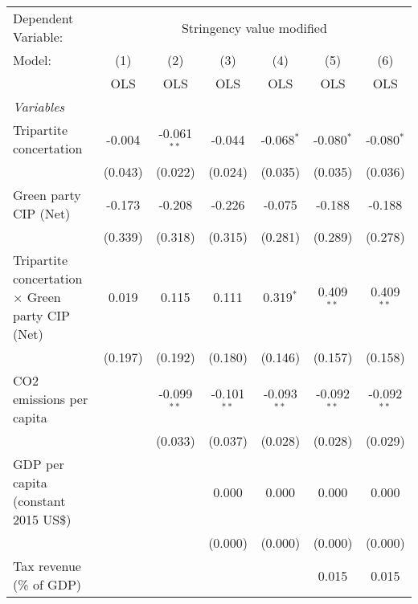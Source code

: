 
\begingroup
\centering
\begin{tabular}{lcccccc}
   \toprule
   Dependent Variable: & \multicolumn{6}{c}{Stringency value modified}\\
   Model:                                                  & (1)     & (2)           & (3)           & (4)           & (5)           & (6)\\  
                                                           &  OLS    & OLS           & OLS           & OLS           & OLS           & OLS\\  
   \midrule
   \emph{Variables}\\
   Tripartite concertation                                 & -0.004  & -0.061$^{**}$ & -0.044        & -0.068$^{*}$  & -0.080$^{*}$  & -0.080$^{*}$\\   
                                                           & (0.043) & (0.022)       & (0.024)       & (0.035)       & (0.035)       & (0.036)\\   
   Green party CIP (Net)                                   & -0.173  & -0.208        & -0.226        & -0.075        & -0.188        & -0.188\\   
                                                           & (0.339) & (0.318)       & (0.315)       & (0.281)       & (0.289)       & (0.278)\\   
   Tripartite concertation $\times$ Green party CIP (Net)  & 0.019   & 0.115         & 0.111         & 0.319$^{*}$   & 0.409$^{**}$  & 0.409$^{**}$\\   
                                                           & (0.197) & (0.192)       & (0.180)       & (0.146)       & (0.157)       & (0.158)\\   
   CO2 emissions per capita                                &         & -0.099$^{**}$ & -0.101$^{**}$ & -0.093$^{**}$ & -0.092$^{**}$ & -0.092$^{**}$\\   
                                                           &         & (0.033)       & (0.037)       & (0.028)       & (0.028)       & (0.029)\\   
   GDP per capita (constant 2015 US\$)                     &         &               & 0.000         & 0.000         & 0.000         & 0.000\\   
                                                           &         &               & (0.000)       & (0.000)       & (0.000)       & (0.000)\\   
   Tax revenue (\% of GDP)                                 &         &               &               &               & 0.015         & 0.015\\   

\end{tabular}

